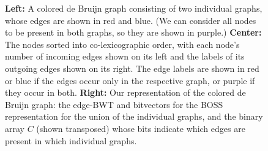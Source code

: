 \begin{figure}[h]
  \caption{{\bf Left:} A colored de Bruijn graph consisting of two individual graphs, whose edges are shown in red and blue.  (We can consider all nodes to be present in both graphs, so they are shown in purple.)  {\bf Center:} The nodes sorted into co-lexicographic order, with each node's number of incoming edges shown on its left and the labels of its outgoing edges shown on its right.  The edge labels are shown in red or blue if the edges occur only in the respective graph, or purple if they occur in both.  {\bf Right:} Our representation of the colored de Bruijn graph: the edge-BWT and bitvectors for the BOSS representation for the union of the individual graphs, and the binary array $C$ (shown transposed) whose bits indicate which edges are present in which individual graphs.}

\label{fig:purple-vari}
\end{figure}

